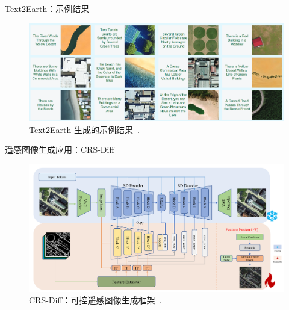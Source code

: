 \begin{refsection}
  \begin{frame}{Text2Earth：示例结果}
    \begin{figure}
      \centering
      \includegraphics[width=0.9\linewidth]{figs/text2earth_results.png}
      \caption[]{\scriptsize Text2Earth 生成的示例结果~\parencite{text2earth2025}.}
    \end{figure}
    \bottomleftrefs
  \end{frame}
\end{refsection}

\begin{refsection}
\begin{frame}{遥感图像生成应用：CRS-Diff}
  \begin{figure}
    \centering
    \includegraphics[width=0.9\linewidth]{figs/crsdiff.png}
    \caption[]{\scriptsize CRS-Diff：可控遥感图像生成框架~\parencite{tang2024crsdiff}.}
  \end{figure}
  \bottomleftrefs
\end{frame}
\end{refsection}

